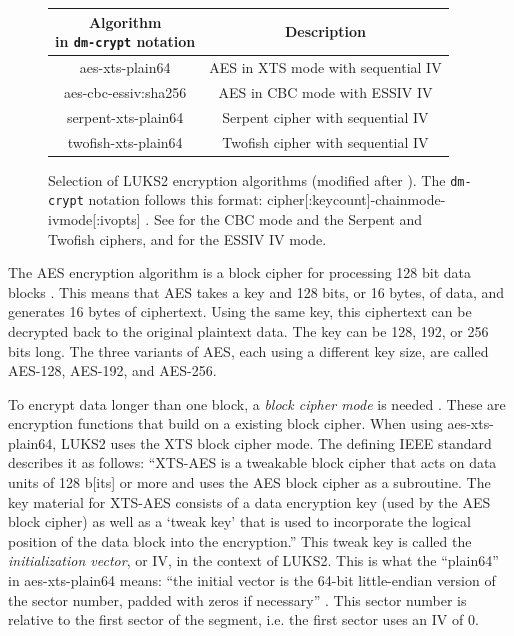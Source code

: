 \begin{figure}[htb!]
	\center
	\begin{tabular}{cc}
		\makecell{\textbf{Algorithm}\\in \texttt{dm-crypt} notation} & \textbf{Description} \\
		\hline
		aes-xts-plain64 & AES in XTS mode with sequential IV \\
		aes-cbc-essiv:sha256 & AES in CBC mode with ESSIV IV \\
		serpent-xts-plain64 & Serpent cipher with sequential IV \\
		twofish-xts-plain64 & Twofish cipher with sequential IV
	\end{tabular}
	\caption[
		Selection of LUKS2 encryption algorithms
	]{
		Selection of LUKS2 encryption algorithms (modified after \cite{Broz2018}). The \texttt{dm-crypt} notation follows this format: cipher[:keycount]-chainmode-ivmode[:ivopts] \cite{Dmcrypt2020}. See \cite{Ferguson2010} for the CBC mode and the Serpent and Twofish ciphers, and \cite{Fruhwirth2005} for the ESSIV IV mode.
	}
	\label{fig:background.luks2.encryptionalgorithms}
\end{figure}

The AES encryption algorithm is a block cipher for processing 128 bit data blocks \cite{Fips197}. This means that AES takes a key and 128 bits, or 16 bytes, of data, and generates 16 bytes of ciphertext. Using the same key, this ciphertext can be decrypted back to the original plaintext data. The key can be 128, 192, or 256 bits long. The three variants of AES, each using a different key size, are called AES-128, AES-192, and AES-256.

To encrypt data longer than one block, a \emph{block cipher mode} is needed \cite{Ferguson2010}. These are encryption functions that build on a existing block cipher. When using aes-xts-plain64, LUKS2 uses the XTS block cipher mode. The defining IEEE standard \cite{Ieee2019} describes it as follows: ``XTS-AES is a tweakable block cipher that acts on data units of 128 b[its] or more and uses the AES block cipher as a subroutine. The key material for XTS-AES consists of a data encryption key (used by the AES block cipher) as well as a `tweak key' that is used to incorporate the logical position of the data block into the encryption.'' This tweak key is called the \emph{initialization vector}, or IV, in the context of LUKS2. This is what the ``plain64'' in aes-xts-plain64 means: ``the initial vector is the 64-bit little-endian version of the sector number, padded with zeros if necessary'' \cite{Dmcrypt2020}. This sector number is relative to the first sector of the segment, i.e. the first sector uses an IV of 0.

